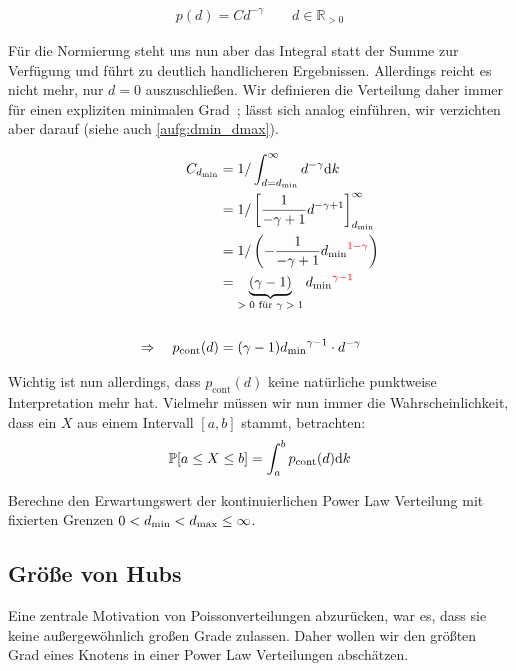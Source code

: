 \begin{align}
    p(d) = C d^{-\gamma} \quad\quad d \in \mathbb R_{> 0}
\end{align}

Für die Normierung steht uns nun aber das Integral statt der Summe zur Verfügung und führt zu deutlich handlicheren Ergebnissen.
Allerdings reicht es nicht mehr, nur $d = 0$ auszuschließen.
Wir definieren die Verteilung daher immer für einen expliziten minimalen Grad~\dmin; \dmax{} lässt sich analog einführen, wir verzichten aber darauf (siehe auch \cref{aufg:dmin_dmax}).

\begin{align}
    C_{{d_{\text{min}}}}                           & = 1 / \int_{d={d_{\text{min}}}}^\infty d^{-\gamma} \text d k                                                \\
                                      & = 1 / \left[ \frac{1}{-\gamma + 1} d^{-\gamma + 1}  \right]_{{d_{\text{min}}}}^\infty                       \\
                                      & = 1 / \left( - \frac{1}{-\gamma + 1} {d_{\text{min}}}^{\textcolor{red}{1 - \gamma}}  \right)              \\
                                      & = \underbrace{( \gamma-1)}_{\text{$> 0$ für $\gamma > 1$}} {d_{\text{min}}}^{\textcolor{red}{\gamma - 1}} \\
    \nonumber                                                                                                                          \\
    \Rightarrow\quad p_\text{cont}(d) & = (\gamma-1) {d_{\text{min}}}^{\gamma - 1} \cdot d^{-\gamma}
\end{align}

Wichtig ist nun allerdings, dass $p_\text{cont}(d)$ keine natürliche punktweise Interpretation mehr hat.
Vielmehr müssen wir nun immer die Wahrscheinlichkeit, dass ein $X$ aus einem Intervall $[a, b]$ stammt, betrachten:
\begin{align}
    \mathbb{P}\!\left[a \le X \le b\right] = \int_{a}^b p_\text{cont}(d) \text d k
\end{align}

\begin{exercise}
    Berechne den Erwartungswert der kontinuierlichen Power Law Verteilung mit fixierten Grenzen $0 < {d_{\text{min}}} < {d_{\text{max}}} \le \infty$.
\end{exercise}

\subsection{Größe von Hubs}
Eine zentrale Motivation von Poissonverteilungen abzurücken, war es, dass sie keine außergewöhnlich großen Grade zulassen.
Daher wollen wir den größten Grad eines Knotens in einer Power Law Verteilungen abschätzen.

